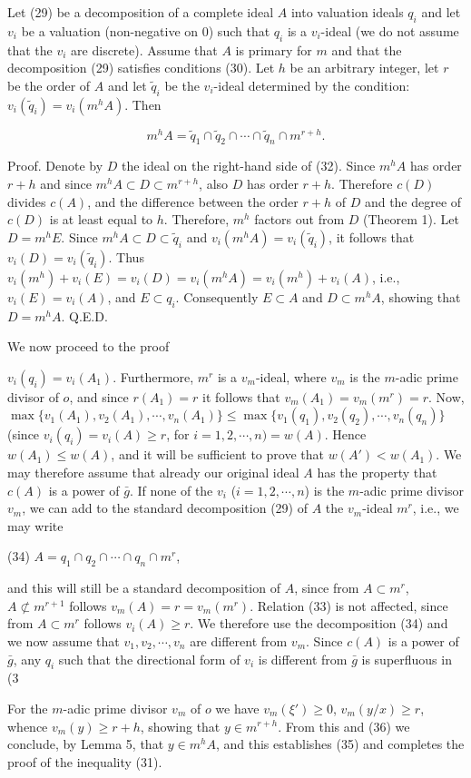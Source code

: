 Let (29) be a decomposition of a complete ideal $A$ into valuation ideals $q_i$ and let $v_i$ be a valuation (non-negative on $0$) such that $q_i$ is a $v_i$-ideal (we do not assume that the $v_i$ are discrete). Assume that $A$ is primary for $m$ and that the decomposition (29) satisfies conditions (30). Let $h$ be an arbitrary integer, let $r$ be the order of $A$ and let $\tilde{q}_i$ be the $v_i$-ideal determined by the condition: $v_i(\tilde{q}_i) = v_i(m^h A)$. Then

$$m^h A = \tilde{q}_1 \cap \tilde{q}_2 \cap \cdots \cap \tilde{q}_n \cap m^{r+h}.$$

Proof. Denote by $D$ the ideal on the right-hand side of (32). Since $m^h A$ has order $r+h$ and since $m^h A \subset D \subset m^{r+h}$, also $D$ has order $r+h$. Therefore $c(D)$ divides $c(A)$, and the difference between the order $r+h$ of $D$ and the degree of $c(D)$ is at least equal to $h$. Therefore, $m^h$ factors out from $D$ (Theorem 1). Let $D = m^h E$. Since $m^h A \subset D \subset \tilde{q}_i$ and $v_i(m^h A) = v_i(\tilde{q}_i)$, it follows that $v_i(D) = v_i(\tilde{q}_i)$. Thus $v_i(m^h) + v_i(E) = v_i(D) = v_i(m^h A) = v_i(m^h) + v_i(A)$, i.e., $v_i(E) = v_i(A)$, and $E \subset q_i$. Consequently $E \subset A$ and $D \subset m^h A$, showing that $D = m^h A$. Q.E.D.

We now proceed to the proof

$v_i(q_i) = v_i(A_1)$. Furthermore, $m^r$ is a $v_m$-ideal, where $v_m$ is the $m$-adic prime divisor of $o$, and since $r(A_1) = r$ it follows that $v_m(A_1) = v_m(m^r) = r$. Now, $\max \{v_1(A_1), v_2(A_1), \cdots, v_n(A_1)\} \leq \max \{v_1(q_1), v_2(q_2), \cdots, v_n(q_n)\}$ (since $v_i(q_i) = v_i(A) \geq r$, for $i = 1, 2, \cdots, n) = w(A)$. Hence $w(A_1) \leq w(A)$, and it will be sufficient to prove that $w(A') < w(A_1)$. We may therefore assume that already our original ideal $A$ has the property that $c(A)$ is a power of $\bar{g}$. If none of the $v_i$ ($i = 1, 2, \cdots, n$) is the $m$-adic prime divisor $v_m$, we can add to the standard decomposition (29) of $A$ the $v_m$-ideal $m^r$, i.e., we may write

(34) $A = q_1 \cap q_2 \cap \cdots \cap q_n \cap m^r$,

and this will still be a standard decomposition of $A$, since from $A \subset m^r$, $A \not\subset m^{r+1}$ follows $v_m(A) = r = v_m(m^r)$. Relation (33) is not affected, since from $A \subset m^r$ follows $v_i(A) \geq r$. We therefore use the decomposition (34) and we now assume that $v_1, v_2, \cdots, v_n$ are different from $v_m$. Since $c(A)$ is a power of $\bar{g}$, any $q_i$ such that the directional form of $v_i$ is different from $\bar{g}$ is superfluous in (3

For the $m$-adic prime divisor $v_m$ of $o$ we have $v_m(\xi') \geq 0$, $v_m(y/x) \geq r$, whence $v_m(y) \geq r + h$, showing that $y \in m^{r+h}$. From this and (36) we conclude, by Lemma 5, that $y \in m^h A$, and this establishes (35) and completes the proof of the inequality (31).